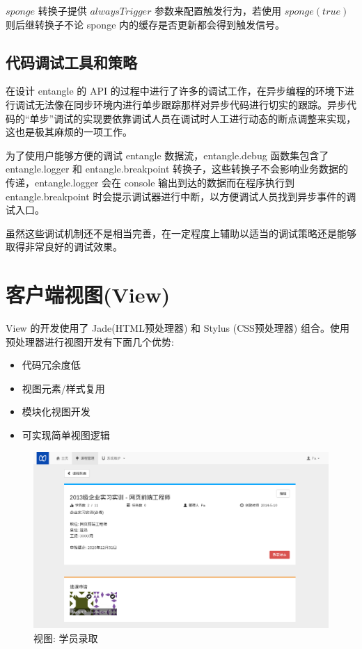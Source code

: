 $sponge$ 转换子提供 $alwaysTrigger$ 参数来配置触发行为，若使用 $sponge(true)$ 则后继转换子不论 sponge 内的缓存是否更新都会得到触发信号。

\subsection{代码调试工具和策略}

在设计 entangle 的 API 的过程中进行了许多的调试工作，在异步编程的环境下进行调试无法像在同步环境内进行单步跟踪那样对异步代码进行切实的跟踪。异步代码的“单步”调试的实现要依靠调试人员在调试时人工进行动态的断点调整来实现，这也是极其麻烦的一项工作。

为了使用户能够方便的调试 entangle 数据流，entangle.debug 函数集包含了 entangle.logger 和 entangle.breakpoint 转换子，这些转换子不会影响业务数据的传递，entangle.logger 会在 console 输出到达的数据而在程序执行到 entangle.breakpoint 时会提示调试器进行中断，以方便调试人员找到异步事件的调试入口。

虽然这些调试机制还不是相当完善，在一定程度上辅助以适当的调试策略还是能够取得非常良好的调试效果。

\section{客户端视图(View)}

View 的开发使用了 Jade(HTML预处理器) 和 Stylus (CSS预处理器) 组合。使用预处理器进行视图开发有下面几个优势:

\begin{itemize}
  \item 代码冗余度低
  \item 视图元素/样式复用
  \item 模块化视图开发
  \item 可实现简单视图逻辑
\end{itemize}

\begin{figure}[!h]
  \begin{center}
    \includegraphics[scale=0.3]{figures/screenshot/enroll.png}
    \caption{视图: 学员录取\label{SSEnroll}}
  \end{center}
\end{figure}

